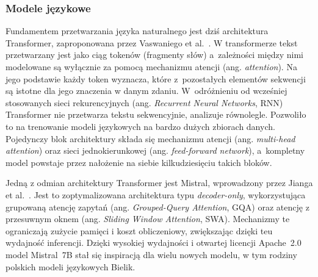 \subsubsection{Modele językowe}
\label{subsec:modele_jezykowe}
%
Fundamentem przetwarzania języka naturalnego jest dziś architektura Transformer, zaproponowana przez Vaswaniego et al.~\cite{Vaswani2017}. W transformerze tekst przetwarzany jest jako ciąg tokenów (fragmenty słów) a~zależności między nimi modelowane są wyłącznie za pomocą mechanizmu atencji (ang. \emph{attention}). Na jego podstawie każdy token wyznacza, które z~pozostałych elementów sekwencji są istotne dla jego znaczenia w danym zdaniu. W~odróżnieniu od wcześniej stosowanych sieci rekurencyjnych (ang. \emph{Recurrent Neural Networks}, RNN) Transformer nie przetwarza tekstu sekwencyjnie, analizuje równolegle. Pozwoliło to na trenowanie modeli językowych na bardzo dużych zbiorach danych. Pojedynczy blok architektury składa się mechanizmu atencji (ang. \emph{multi-head attention}) oraz sieci jednokierunkowej (ang. \emph{feed-forward network}), a~kompletny model powstaje przez nałożenie na siebie kilkudziesięciu takich bloków.

Jedną z odmian architektury Transformer jest Mistral, wprowadzony przez Jianga et al.~\cite{Jiang2023Mistral}. Jest to zoptymalizowana architektura typu \emph{decoder-only}, wykorzystująca grupowaną atencję zapytań (ang. \emph{Grouped-Query Attention}, GQA) oraz atencję z przesuwnym oknem (ang. \emph{Sliding Window Attention}, SWA). Mechanizmy te ograniczają zużycie pamięci i koszt obliczeniowy, zwiększając dzięki teu wydajność inferencji. Dzięki wysokiej wydajności i otwartej licencji Apache~2.0  model Mistral~7B stał się inspiracją dla wielu nowych modelu, w tym rodziny polskich modeli językowych Bielik.


